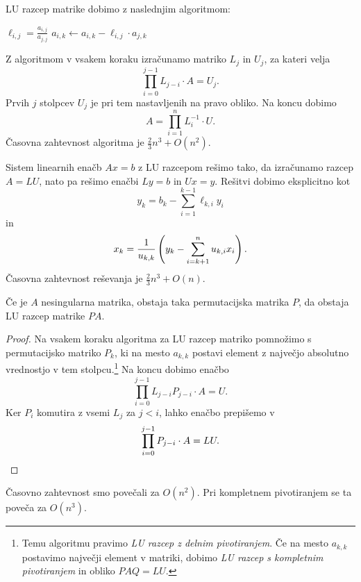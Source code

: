 \begin{opomba}
LU razcep matrike dobimo z naslednjim algoritmom:

\begin{algorithmic}[1]
    \State $\ell_{i,j} = \frac{a_{i,j}}{a_{j,j}}$
      \State $a_{i,k} \gets a_{i,k} - \ell_{i,j} \cdot a_{j,k}$
    \EndFor
  \EndFor
\EndFor
\end{algorithmic}

Z algoritmom v vsakem koraku izračunamo matriko $L_j$ in $U_j$, za
kateri velja
\[
\prod_{i=0}^{j-1} L_{j-i} \cdot A = U_j.
\]
Prvih $j$ stolpcev $U_j$ je pri tem nastavljenih na pravo obliko.
Na koncu dobimo
\[
A = \prod_{i=1}^n L_i^{-1} \cdot U.
\]
Časovna zahtevnost algoritma je $\frac{2}{3} n^3 + O(n^2)$.
\end{opomba}

\begin{opomba}
Sistem linearnih enačb $Ax = b$ z LU razcepom rešimo tako, da
izračunamo razcep $A = LU$, nato pa rešimo enačbi $Ly = b$ in
$Ux = y$. Rešitvi dobimo eksplicitno kot
\[
y_k = b_k - \sum_{i=1}^{k-1} \ell_{k,i} y_i
\]
in
\[
x_k = \frac{1}{u_{k,k}} \left(y_k - \sum_{i=k+1}^n u_{k,i} x_i\right).
\]
Časovna zahtevnost reševanja je $\frac{2}{3} n^3 + O(n)$.
\end{opomba}

\begin{izrek}
Če je $A$ nesingularna matrika, obstaja taka permutacijska matrika
$P$, da obstaja LU razcep matrike $PA$.
\end{izrek}

\begin{proof}
Na vsakem koraku algoritma za LU razcep matriko pomnožimo s
permutacijsko matriko $P_k$, ki na mesto $a_{k,k}$ postavi element
z največjo absolutno vrednostjo v tem stolpcu.\footnote{Temu
algoritmu pravimo \emph{LU razcep z delnim pivotiranjem}. Če na
mesto $a_{k,k}$ postavimo največji element v matriki, dobimo
\emph{LU razcep s kompletnim pivotiranjem} in obliko $PAQ = LU$.}
Na koncu dobimo enačbo
\[
\prod_{i=0}^{j-1} L_{j-i} P_{j-i} \cdot A = U.
\]
Ker $P_i$ komutira z vsemi $L_j$ za $j < i$, lahko enačbo prepišemo
v
\[
\prod_{i=0}^{j-1} P_{j-i} \cdot A = LU. \qedhere
\]
\end{proof}

\begin{opomba}
Časovno zahtevnost smo povečali za $O(n^2)$. Pri kompletnem
pivotiranjem se ta poveča za $O(n^3)$.
\end{opomba}


